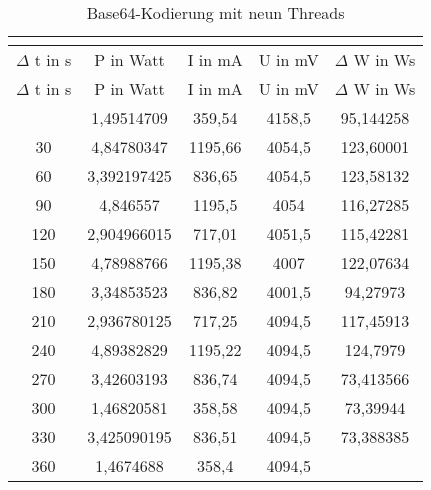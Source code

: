 
\begin{longtable}[c]{ccccc}
\caption{Base64-Kodierung mit neun Threads} \\
\label{tab:Base64MessungThreadNeun}\\
\hline
{$\Delta$ t in s} & {P in Watt} & {I in mA} & {U in mV} & {$\Delta$ W in Ws} \\
\hline
\endfirsthead
\hline
$\Delta$ t in s & P in Watt & I in mA & U in mV & $\Delta$ W in Ws \\
\hline
\endhead
\hline
\endfoot
\hline
    \midrule
    0     & 1,49514709 & 359,54 & 4158,5 & 95,144258 \\
    \midrule
    30    & 4,84780347 & 1195,66 & 4054,5 & 123,60001 \\
    \midrule
    60    & 3,392197425 & 836,65 & 4054,5 & 123,58132 \\
    \midrule
    90    & 4,846557 & 1195,5 & 4054  & 116,27285 \\
    \midrule
    120   & 2,904966015 & 717,01 & 4051,5 & 115,42281 \\
    \midrule
    150   & 4,78988766 & 1195,38 & 4007  & 122,07634 \\
    \midrule
    180   & 3,34853523 & 836,82 & 4001,5 & 94,27973 \\
    \midrule
    210   & 2,936780125 & 717,25 & 4094,5 & 117,45913 \\
    \midrule
    240   & 4,89382829 & 1195,22 & 4094,5 & 124,7979 \\
    \midrule
    270   & 3,42603193 & 836,74 & 4094,5 & 73,413566 \\
    \midrule
    300   & 1,46820581 & 358,58 & 4094,5 & 73,39944 \\
    \midrule
    330   & 3,425090195 & 836,51 & 4094,5 & 73,388385 \\
    \midrule
    360   & 1,4674688 & 358,4 & 4094,5 &  \\
\end{longtable}

